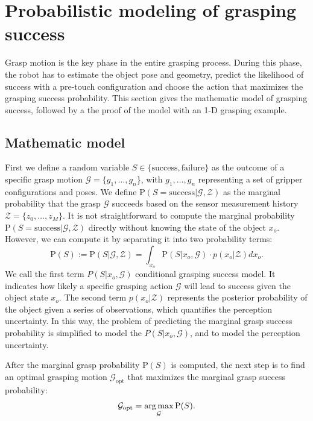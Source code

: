 \section{Probabilistic modeling of grasping success}
Grasp motion is the key phase in the entire grasping process. During this phase, the robot has to estimate the object pose and geometry, predict the likelihood of success with a pre-touch configuration and choose the action that maximizes the
grasping success probability. This section gives the mathematic model of grasping success, followed by a the proof of the model with an 1-D grasping example. 
\subsection{Mathematic model}
First we define a random variable $S \in \{ \text{success} , \text{failure} \}$ as the outcome of a specific grasp motion $\mathcal{G} = \{g_1, \dots ,g_n$\}, with $g_1, \dots ,g_n$ representing a set of gripper configurations and poses. We define $\text{P}({S = \text{success}}|\mathcal{G},\mathcal{Z})$ as the marginal probability that the grasp $\mathcal{G}$ succeeds based on the sensor measurement history $\mathcal{Z}=\lbrace z_0, \dots ,z_M \rbrace$. It is not straightforward to compute the marginal probability $\text{P}({S = \text{success}}|\mathcal{G},\mathcal{Z})$ directly without knowing the state of the object 
$x_o$. However, we can compute it by separating it into two probability terms: 
\begin{equation}
\text{P}(S) := \text{P}(S | \mathcal{G} ,\mathcal{Z}) = \int_{x_o} \text{P} (S | x_o,\mathcal{G} )\cdot p(x_o|\mathcal{Z}) dx_o. 
\label{e_grasp_success}
\end{equation}
We call the first term $P(S | x_o,\mathcal{G})$ conditional grasping success model. It indicates how likely a specific grasping action $\mathcal{G}$ will lead to success given the object state $x_o$. The second term $p(x_o|\mathcal{Z})$ represents the posterior probability of the object given a series of observations, which quantifies the perception uncertainty. In this way, the problem of predicting the marginal grasp success probability is simplified to model the $P(S | x_o,\mathcal{G})$, and to model the perception uncertainty. 

After the marginal grasp probability $\text{P}(S)$ is computed, the next step is to find an optimal grasping motion $\mathcal{G}_\text{opt}$ that maximizes the marginal grasp success probability:
\begin{equation}
\mathcal{G}_\text{opt} = \operatorname*{arg\,max}_\mathcal{G} \text{P}(S).
\label{eq_g_opt}
\end{equation}

